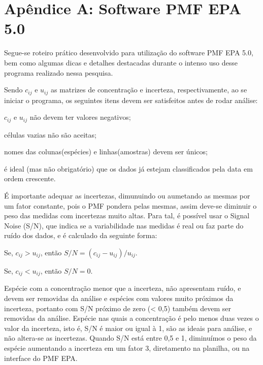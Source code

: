 \chapter{Apêndice A: Software PMF EPA 5.0}

Segue-se roteiro prático desenvolvido para utilização do software PMF EPA 5.0, 
bem como algumas dicas e detalhes destacadas durante o intenso uso desse 
programa realizado nessa pesquisa.  

Sendo $c_{ij}$ e $u_{ij}$ as matrizes de concentração e incerteza, 
respectivamente, ao se iniciar o programa, os seguintes itens devem ser 
satisfeitos antes de rodar análise:

\begin{itemize}
  \begin{spacing}{1.0}
  \item $c_{ij}$ e $u_{ij}$ não devem ter valores negativos;
  \item células vazias não são aceitas;
  \item nomes das colunas(espécies) e linhas(amostras) devem ser únicos;
  \item é ideal (mas não obrigatório) que os dados já estejam classificados 
        pela data em ordem crescente.
  \end{spacing}
\end{itemize}

É importante adequar as incertezas, dimunuindo ou aumetando as mesmas por um 
fator constante, pois o PMF pondera pelas mesmas, assim deve-se diminuir o peso
das medidas com incertezas muito altas. Para tal, é possível usar o 
Signal Noise (S/N), que indica se a variabilidade nas medidas é real ou faz 
parte do ruído dos dados, e é calculado da seguinte forma: 

\begin{itemize}
  \begin{spacing}{1.0}
    \item Se, $c_{ij} >  u_{ij}$, então $ S/N = (c_{ij} - u_{ij})/u_{ij}$.
    \item Se, $c_{ij} <  u_{ij}$, então $ S/N = 0 $.
  \end{spacing}
\end{itemize}

Espécie com a concentração menor que a incerteza, não apresentam ruído, e devem 
ser removidas da análise e espécies com valores muito próximos da incerteza, 
portanto com S/N próximo de zero (< 0,5) também devem ser removidas da 
análise. Espécie nas quais a concentração é pelo menos duas vezes o valor da 
incerteza, isto é, S/N é maior ou igual à 1, são as ideais para análise, 
e não altera-se as incertezas.
Quando S/N está entre 0,5 e 1, diminuímos o peso da espécie aumentando a 
incerteza em um fator 3, diretamento na planilha, ou na interface do PMF EPA.   

